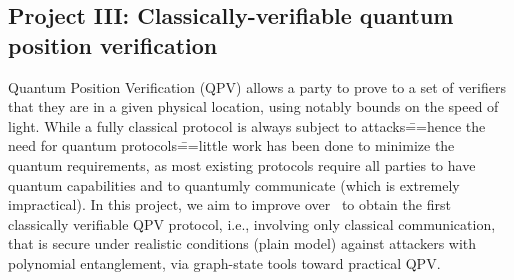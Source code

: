 

\subsection{Project III: Classically-verifiable quantum position verification}

Quantum Position Verification (QPV) allows a party to prove to a set of verifiers that they are in a given physical location, using notably bounds on the speed of light. While a fully classical protocol is always subject to attacks\===hence the need for quantum protocols\===little work has been done to minimize the quantum requirements, as most existing protocols require all parties to have quantum capabilities and to quantumly communicate (which is extremely impractical). In this project, we aim to improve over~\cite{LLQ21_BeatingClassicalImpossibility} to obtain the first classically verifiable QPV protocol, i.e., involving only classical communication, that is secure under realistic conditions (plain model) against attackers with polynomial entanglement, via graph-state tools toward practical QPV. %

